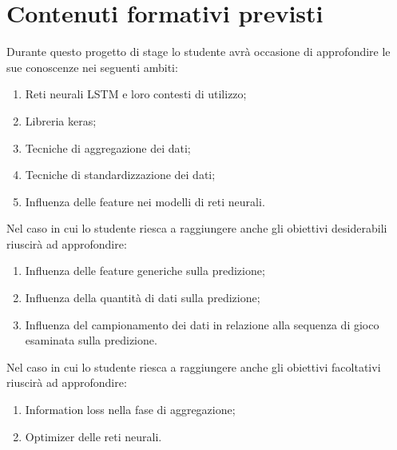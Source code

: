 \section*{Contenuti formativi previsti}
Durante questo progetto di stage lo studente avrà occasione di approfondire le sue conoscenze nei seguenti ambiti:
\begin{enumerate}
    \item Reti neurali LSTM e loro contesti di utilizzo;
    \item Libreria keras;
	\item Tecniche di aggregazione dei dati;
	\item Tecniche di standardizzazione dei dati;
	\item Influenza delle feature nei modelli di reti neurali.
\end{enumerate}

Nel caso in cui lo studente riesca a raggiungere anche gli obiettivi desiderabili riuscirà ad approfondire:
\begin{enumerate}
    \item Influenza delle feature generiche sulla predizione;
    \item Influenza della quantità di dati sulla predizione;
	\item Influenza del campionamento dei dati in relazione alla sequenza di gioco esaminata sulla predizione.
\end{enumerate}

Nel caso in cui lo studente riesca a raggiungere anche gli obiettivi facoltativi riuscirà ad approfondire:
\begin{enumerate}
    \item Information loss nella fase di aggregazione;
	\item Optimizer delle reti neurali.
\end{enumerate}
